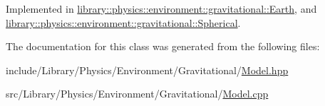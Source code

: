 Implemented in \hyperlink{classlibrary_1_1physics_1_1environment_1_1gravitational_1_1_earth_a493e78b74deb178fcbed8eff70adb390}{library\+::physics\+::environment\+::gravitational\+::\+Earth}, and \hyperlink{classlibrary_1_1physics_1_1environment_1_1gravitational_1_1_spherical_ae33a94d691c7fa1aea5bfc629fd3fb9f}{library\+::physics\+::environment\+::gravitational\+::\+Spherical}.



The documentation for this class was generated from the following files\+:\begin{DoxyCompactItemize}
\item 
include/\+Library/\+Physics/\+Environment/\+Gravitational/\hyperlink{_model_8hpp}{Model.\+hpp}\item 
src/\+Library/\+Physics/\+Environment/\+Gravitational/\hyperlink{_model_8cpp}{Model.\+cpp}\end{DoxyCompactItemize}
